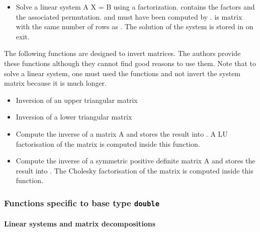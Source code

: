 \begin{itemize}
\item {}
  \sshortdescribe Solve a linear system A X = B using a  factorization.
   contains the  factors and  the associated permutation.
   and  must have been computed by .  is matrix
  with the same number of rows as .
  The solution of the system is stored in  on exit. 

\end{itemize}


The following functions are designed to invert matrices. The authors provide
these functions although they cannot find good reasons to use them. Note that
to solve a linear system, one must used the  functions and not
invert the system matrix because it is much longer.
\begin{itemize}
\item {}
  \sshortdescribe Inversion of an upper triangular matrix  

\item {}
  \sshortdescribe Inversion of a lower triangular matrix  

\item {}
  \sshortdescribe Compute the inverse of a matrix A and stores the result
  into . A LU factorisation of the matrix  is computed
  inside this function.
\item {}
  \sshortdescribe Compute the inverse of a symmetric positive definite matrix
  A and stores the result into . The Cholesky factorisation of
  the matrix  is computed inside this function.
\end{itemize}

\subsubsection{Functions specific to base type {\tt double}}


\paragraph{Linear systems and matrix decompositions}

